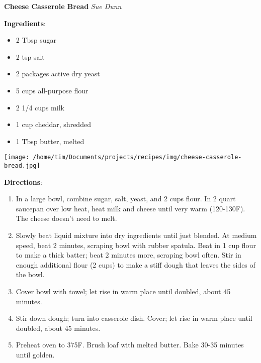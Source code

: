 \documentclass[11pt, twoside, openany]{book}
\begin{document}
\noindent\begin{minipage}[t]{\linewidth}%
{\Large\textbf{Cheese Casserole Bread}} \label{cheese-casserole-bread}\hfill\textit{Sue Dunn}\\
\noindent\begin{minipage}[t]{0.78\linewidth}%
\textbf{Ingredients}:\vspace{-3mm}
\begin{multicols}{2}
\begin{itemize}\setlength\itemsep{-1mm}
\item 2 Tbsp sugar
\item 2 tsp salt
\item 2 packages active dry yeast
\item 5 cups all-purpose flour
\item 2 1/4 cups milk
\item 1 cup cheddar, shredded
\item 1 Tbsp butter, melted
\end{itemize}
\end{multicols}
\end{minipage}
\noindent\begin{minipage}[t]{0.18\linewidth}
\centering \strut\vspace*{-\baselineskip}\newline
\texttt{[image: /home/tim/Documents/projects/recipes/img/cheese-casserole-bread.jpg]}\\
\end{minipage}\vspace{3mm}
\textbf{Directions}:
\vspace{-3mm}\begin{enumerate}\setlength\itemsep{-1mm}
\item In a large bowl, combine sugar, salt, yeast, and 2 cups flour. In 2 quart saucepan over low heat, heat milk and cheese until very warm (120-130F). The cheese doesn't need to melt.
\item Slowly beat liquid mixture into dry ingredients until just blended. At medium speed, beat 2 minutes, scraping bowl with rubber spatula. Beat in 1 cup flour to make a thick batter; beat 2 minutes more, scraping bowl often. Stir in enough additional flour (2 cups) to make a stiff dough that leaves the sides of the bowl.
\item Cover bowl with towel; let rise in warm place until doubled, about 45 minutes.
\item Stir down dough; turn into casserole dish. Cover; let rise in warm place until doubled, about 45 minutes.
\item Preheat oven to 375F. Brush loaf with melted butter. Bake 30-35 minutes until golden.
\end{enumerate}
\end{minipage}\vspace{8mm}
\end{document}
